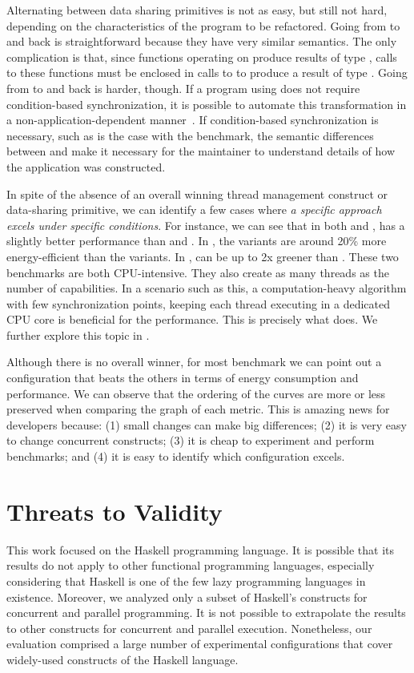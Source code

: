 Alternating between data sharing primitives is not as easy, but still not hard, depending on the characteristics of the program to be refactored. Going from \MVar to \TMVar and back is straightforward because they have very similar semantics. The only complication is that, since functions operating on \TMVar produce results of type \STM, calls to these functions must be enclosed in calls to \atomically to produce a result of type \IO. Going from \MVar to \TVar and back is harder, though. If a program using \MVar does not require condition-based synchronization, it is possible to automate this transformation in a non-application-dependent manner~\cite{soares-neto:2014}. If condition-based synchronization is necessary, such as is the case with the \dining benchmark, the semantic differences between \TVar and \MVar make it necessary for the maintainer to understand details of how the application was constructed.

In spite of the absence of an overall winning thread management construct or data-sharing primitive, we can identify a few cases where \emph{a specific approach excels under specific conditions}. For instance, we can see that in both \mandelbrot and \spectral, \forkOn has a slightly better performance than \forkIO and \forkOS. In \mandelbrot, the \forkOn variants are around 20\% more energy-efficient than the \forkIO variants. In \spectral, \forkOn can be up to 2x greener than \forkOS. These two benchmarks are both CPU-intensive. They also create as many threads as the number of capabilities. In a scenario such as this, a computation-heavy algorithm with few synchronization points, keeping each thread executing in a dedicated CPU core is beneficial for the performance. This is precisely what \forkOn does. We further explore this topic in .

Although there is no overall winner, for most benchmark we can point out a configuration that beats the others in terms of energy consumption and performance. We can observe that the ordering of the curves are more or less preserved when comparing the graph of each metric. This is amazing news for developers because: (1) small changes can make big differences; (2) it is very easy to change concurrent constructs; (3) it is cheap to experiment and perform benchmarks; and (4) it is easy to identify which configuration excels.


\section{Threats to Validity}\label{sec:threats}
This work focused on the Haskell programming language. It is possible that its results do not apply to other functional programming languages, especially considering that Haskell is one of the few lazy programming languages in existence. Moreover, we analyzed only a subset of Haskell's constructs for concurrent and parallel programming. It is not possible to extrapolate the results to other constructs for concurrent and parallel execution. Nonetheless, our evaluation comprised a large number of experimental configurations that cover widely-used constructs of the Haskell language.

